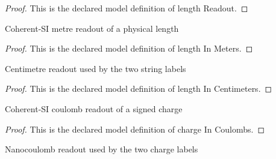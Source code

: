 \begin{proof}
  This is the declared model definition of length Readout.
\end{proof}
\begin{definition}
  \label{def:physics:phyx-mini-0906:phyxminiproblems-problemphyxmini0906-lengthinmeters}
  Coherent-SI metre readout of a physical length
\end{definition}
\begin{proof}
  This is the declared model definition of length In Meters.
\end{proof}
\begin{definition}
  \label{def:physics:phyx-mini-0906:phyxminiproblems-problemphyxmini0906-lengthincentimeters}
  Centimetre readout used by the two string labels
\end{definition}
\begin{proof}
  This is the declared model definition of length In Centimeters.
\end{proof}
\begin{definition}
  \label{def:physics:phyx-mini-0906:phyxminiproblems-problemphyxmini0906-chargeincoulombs}
  Coherent-SI coulomb readout of a signed charge
\end{definition}
\begin{proof}
  This is the declared model definition of charge In Coulombs.
\end{proof}
\begin{definition}
  \label{def:physics:phyx-mini-0906:phyxminiproblems-problemphyxmini0906-chargeinnanocoulombs}
  Nanocoulomb readout used by the two charge labels
\end{definition}
